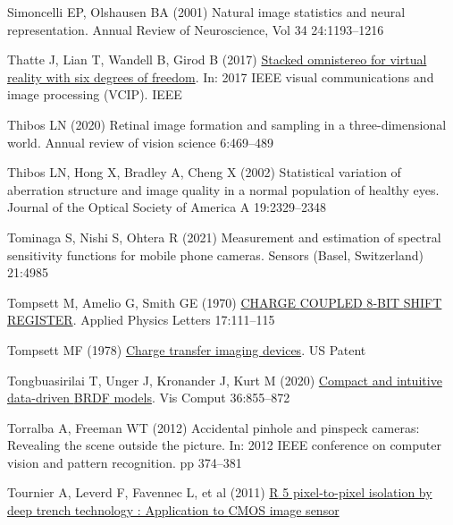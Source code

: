 \documentclass[
  letterpaper,
]{book}
\newlength{\cslhangindent}
\newenvironment{CSLReferences}[2] %
 {\begin{list}{}{%
  \setlength{\itemindent}{0pt}
  \setlength{\leftmargin}{0pt}
  \setlength{\parsep}{0pt}
  \ifodd #1
   \setlength{\leftmargin}{\cslhangindent}
   \setlength{\itemindent}{-1\cslhangindent}
  \fi
  \setlength{\itemsep}{#2\baselineskip}}}
 {\end{list}}
\begin{document}
\begin{CSLReferences}{1}{1}
Simoncelli EP, Olshausen BA (2001) Natural image statistics and neural
representation. Annual Review of Neuroscience, Vol 34 24:1193--1216

Thatte J, Lian T, Wandell B, Girod B (2017)
\href{http://dx.doi.org/10.1109/vcip.2017.8305085}{Stacked omnistereo
for virtual reality with six degrees of freedom}. In: 2017 IEEE visual
communications and image processing (VCIP). IEEE

Thibos LN (2020) Retinal image formation and sampling in a
three-dimensional world. Annual review of vision science 6:469--489

Thibos LN, Hong X, Bradley A, Cheng X (2002) Statistical variation of
aberration structure and image quality in a normal population of healthy
eyes. Journal of the Optical Society of America A 19:2329--2348

Tominaga S, Nishi S, Ohtera R (2021) Measurement and estimation of
spectral sensitivity functions for mobile phone cameras. Sensors (Basel,
Switzerland) 21:4985

Tompsett M, Amelio G, Smith GE (1970)
\href{https://pubs.aip.org/aip/apl/article/17/3/111/42008}{{CHARGE}
{COUPLED} {8‐BIT} {SHIFT} {REGISTER}}. Applied Physics Letters
17:111--115

Tompsett MF (1978)
\href{https://patents.google.com/patent/US4085456}{Charge transfer
imaging devices}. US Patent

Tongbuasirilai T, Unger J, Kronander J, Kurt M (2020)
\href{https://link.springer.com/article/10.1007/s00371-019-01664-z}{Compact
and intuitive data-driven {BRDF} models}. Vis Comput 36:855--872

Torralba A, Freeman WT (2012) Accidental pinhole and pinspeck cameras:
{Revealing} the scene outside the picture. In: 2012 {IEEE} conference on
computer vision and pattern recognition. pp 374--381

Tournier A, Leverd F, Favennec L, et al (2011)
\href{https://www.imagesensors.org/Past\%20Workshops/2011\%20Workshop/2011\%20Papers/R05_Tournier_Isolation.pdf}{{R}
5 pixel-to-pixel isolation by deep trench technology : Application to
{CMOS} image sensor}


\end{CSLReferences}
\end{document}
